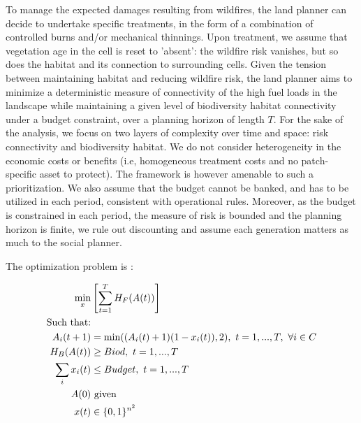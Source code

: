 To manage the expected damages resulting from wildfires, the land planner can decide to undertake specific treatments, in the form of a combination of controlled burns and/or mechanical thinnings. Upon treatment, we assume that vegetation age in the cell is reset to 'absent': the wildfire risk vanishes, but so does the habitat and its connection to surrounding cells. Given the tension between maintaining habitat and reducing wildfire risk, the land planner aims to minimize a deterministic measure of connectivity of the high fuel loads in the landscape while maintaining a given level of biodiversity habitat connectivity under a budget constraint, over a planning horizon of length $T$. 
For the sake of the analysis, we focus on two layers of complexity over time and space: risk connectivity and biodiversity habitat. We do not consider heterogeneity in the economic costs or benefits (i.e, homogeneous treatment costs and no patch-specific asset to protect). The framework is however amenable to such a prioritization. We also assume that the budget cannot be banked, and has to be utilized in each period, consistent with operational rules. Moreover, as the budget is constrained in each period, the measure of risk is bounded and the planning horizon is finite, we rule out discounting and assume each generation matters as much to the social planner. 

The optimization problem is : 

\begin{align}
    \min_x & \left[ \sum_{t=1}^TH_F(A(t))\right]\\
\text{Such that:} \notag \\
A_i(t+1)& = \min((A_i(t)+1)(1-x_i(t)),2),\text{  } t=1, ..., T,\text{  } \forall i \in C    \label{const:dyn}\\
 H_B(A(t))&\geq Biod,\text{  } t=1, ..., T \label{constr:biod}\\
 \sum_i x_i(t) & \leq Budget,\text{  } t=1, ..., T \label{const:budget}\\
 A(0) &\text{ given} \\
x(t)&\in \{0,1\}^{n^2}\label{const:control}
\end{align}

